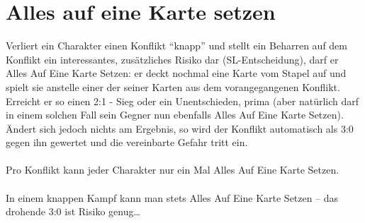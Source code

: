 \section{Alles auf eine Karte setzen}
Verliert ein Charakter einen Konflikt "`knapp"' und stellt ein Beharren auf dem Konflikt ein interessantes, zusätzliches Risiko dar (SL-Entscheidung), darf er Alles Auf Eine Karte Setzen: er deckt nochmal eine Karte vom Stapel auf und spielt sie anstelle einer der seiner Karten aus dem vorangegangenen Konflikt. Erreicht er so einen 2:1 - Sieg oder ein Unentschieden, prima (aber natürlich darf in einem solchen Fall sein Gegner nun ebenfalls Alles Auf Eine Karte Setzen). Ändert sich jedoch nichts am Ergebnis, so wird der Konflikt automatisch als 3:0 gegen ihn gewertet und die vereinbarte Gefahr tritt ein.
\\
\\
Pro Konflikt kann jeder Charakter nur ein Mal Alles Auf Eine Karte Setzen.
\\
\\
In einem knappen Kampf kann man stets Alles Auf Eine Karte Setzen -- das drohende 3:0 ist Risiko genug\dots

